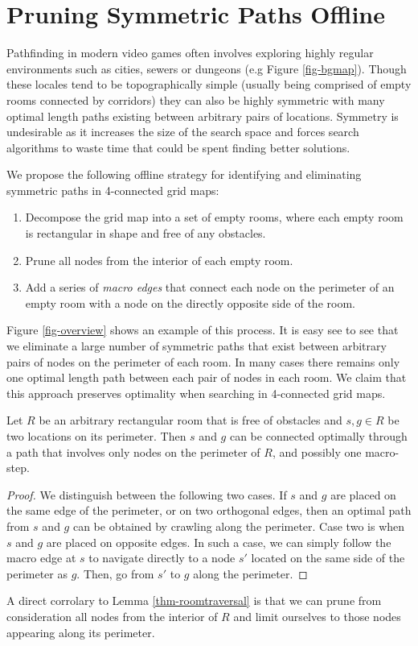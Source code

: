 \section{Pruning Symmetric Paths Offline}
\label{algorithm}
Pathfinding in modern video games often involves exploring highly regular 
environments such as cities, sewers or dungeons (e.g Figure \ref{fig-bgmap}).
Though these locales tend to be topographically simple (usually being comprised
of empty rooms connected by corridors) they can also be highly symmetric 
with many optimal length paths existing between arbitrary pairs of locations.
Symmetry is undesirable as it increases the size of the search space
and forces search algorithms to waste time that could be spent finding better solutions.
\par
We propose the following offline strategy for identifying and eliminating symmetric paths in 
4-connected grid maps:
\begin{enumerate}
\item{Decompose the grid map into a set of empty rooms, where each empty room is 
rectangular in shape and free of any obstacles.}
\item{Prune all nodes from the interior of each empty room.}
\item{Add a series of \emph{macro edges} that connect each node on the perimeter of an empty room
with a node on the directly opposite side of the room.}
\end{enumerate}
Figure \ref{fig-overview} shows an example of this process.
It is easy see to see that we eliminate a large number of symmetric paths
that exist between arbitrary pairs of nodes on the perimeter of each room.
In many cases there remains only one optimal length path between each 
pair of nodes in each room.
We claim that this approach preserves optimality when searching in 
4-connected grid maps. 

\begin{lemma}
\label{thm-roomtraversal}
Let $R$ be an arbitrary rectangular room that is free of obstacles
and $s, g \in R$ be two locations on its perimeter.
Then $s$ and $g$ can be connected optimally through a path that
involves only nodes on the perimeter of $R$, and possibly 
one macro-step.
\end{lemma}
\begin{proof}
\par
We distinguish between the following two cases.
If $s$ and $g$ are placed on the same edge of the perimeter, or
on two orthogonal edges, then an optimal path from $s$ and $g$
can be obtained by crawling along the perimeter.
Case two is when $s$ and $g$ are placed on opposite edges.
In such a case, 
we can simply follow the macro edge at $s$ to navigate directly to a node $s'$ located on
the same side of the perimeter as $g$. Then, go from $s'$ to $g$ along the perimeter.
\end{proof}

A direct corrolary to Lemma \ref{thm-roomtraversal} is that we can prune from consideration
all nodes from the interior of $R$ and limit ourselves to those nodes appearing along its perimeter.
